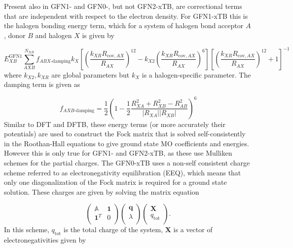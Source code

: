 Present also in GFN1- and GFN0-, but not GFN2-xTB, are correctional terms that are
independent with respect to the electron density. For GFN1-xTB this is the halogen
bonding energy term, which for a system of halogen bond acceptor $A$, donor $B$ and
halogen $X$ is given by

\begin{equation}
    E_{XB}^{\text{GFN}1} \sum^{N_{XB}}_{AXB} f_{ABX\text{-damping}} k_X \left[ \left( \frac{k_{XR} R_{\text{cov}, AX}}{R_{AX}}\right)^{12} - k_{X2} \left(\frac{k_{XR} R_{\text{cov}, AX}}{R_{AX}}\right)^6 \right] \left[ \left( \frac{k_{XR} R_{\text{cov}, AX}}{R_{AX}}\right)^{12} + 1\right]^{-1}
\end{equation}
%
where $k_{X2}, k_{XR}$ are global parameters but $k_X$ is a halogen-specific parameter.
The damping term is given as

\begin{equation}
    f_{AXB\text{-damping}} = \frac{1}{2} \left(1 - \frac{1}{2} \frac{R^2_{XA} + R^2_{XB} - R^2_{AB}}{\left\lvert R_{XA} \right\rvert \left\lvert R_{XB} \right\rvert} \right) ^6
\end{equation}
%
Similar to DFT and DFTB, these energy terms (or more accurately their potentials)
are used to construct the Fock matrix that is solved self-consistently in the Roothan-Hall
equations to give ground state MO coefficients and energies. However this is only
true for GFN1- and GFN2-xTB, as these use Mulliken schemes for the partial charges.
The GFN0-xTB uses a non-self consistent charge scheme referred to as electronegativity
equilibration (EEQ), which means that only one diagonalization of the Fock matrix
is required for a ground state solution. These charges are given by solving the 
matrix equation

\begin{equation}
    \label{eq:eeq_solve}
    \begin{pmatrix}
        \mathbb{A} & \mathbf{1} \\
        \mathbf{1}^T & 0 \\
    \end{pmatrix}
    \begin{pmatrix}
        \mathbf{q} \\
        \lambda \\
    \end{pmatrix}
    \begin{pmatrix}
        \mathbf{X} \\
        q_\text{tot} \\
    \end{pmatrix}.
\end{equation}
%
In this scheme, $q_\text{tot}$ is the total charge of the system, $\mathbf{X}$ is
a vector of electronegativities given by


